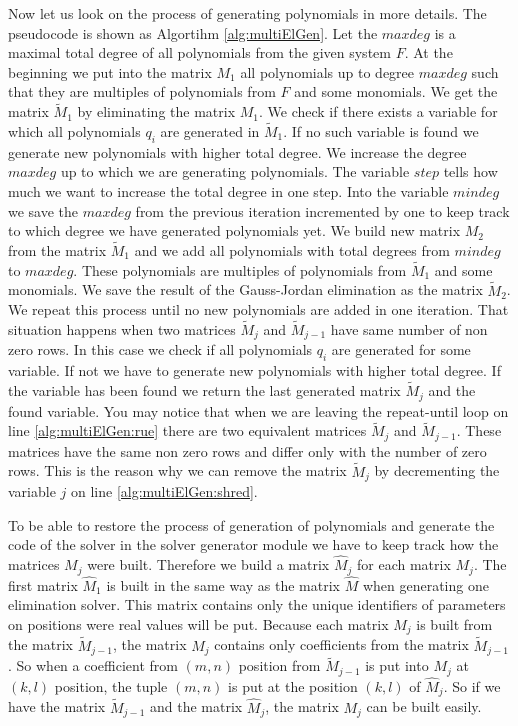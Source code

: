 Now let us look on the process of generating polynomials in more details. The pseudocode is shown as Algortihm \ref{alg:multiElGen}. Let the $maxdeg$ is a maximal total degree of all polynomials from the given system $F$. At the beginning we put into the matrix $M_1$ all polynomials up to degree $maxdeg$ such that they are multiples of polynomials from $F$ and some monomials. We get the matrix $\tilde{M}_1$ by eliminating the matrix $M_1$. We check if there exists a variable for which all polynomials $q_i$ are generated in $\tilde{M}_1$. If no such variable is found we generate new polynomials with higher total degree. We increase the degree $maxdeg$ up to which we are generating polynomials. The variable $step$ tells how much we want to increase the total degree in one step. Into the variable $mindeg$ we save the $maxdeg$ from the previous iteration incremented by one to keep track to which degree we have generated polynomials yet. We build new matrix $M_2$ from the matrix $\tilde{M}_1$ and we add all polynomials with total degrees from $mindeg$ to $maxdeg$. These polynomials are multiples of polynomials from $\tilde{M}_1$ and some monomials. We save the result of the Gauss-Jordan elimination as the matrix $\tilde{M}_2$. We repeat this process until no new polynomials are added in one iteration. That situation happens when two matrices $\tilde{M}_j$ and $\tilde{M}_{j-1}$ have same number of non zero rows. In this case we check if all polynomials $q_i$ are generated for some variable. If not we have to generate new polynomials with higher total degree. If the variable has been found we return the last generated matrix $\tilde{M}_j$ and the found variable. You may notice that when we are leaving the repeat-until loop on line \ref{alg:multiElGen:rue} there are two equivalent matrices $\tilde{M}_j$ and $\tilde{M}_{j-1}$. These matrices have the same non zero rows and differ only with the number of zero rows. This is the reason why we can remove the matrix $\tilde{M}_j$ by decrementing the variable $j$ on line \ref{alg:multiElGen:shred}.



To be able to restore the process of generation of polynomials and generate the code of the solver in the solver generator module we have to keep track how the matrices $M_j$ were built. Therefore we build a matrix $\hat{M}_j$ for each matrix $M_j$. The first matrix $\hat{M}_1$ is built in the same way as the matrix $\hat{M}$ when generating one elimination solver. This matrix contains only the unique identifiers of parameters on positions were real values will be put. Because each matrix $M_j$ is built from the matrix $\tilde{M}_{j-1}$, the matrix $M_j$ contains only coefficients from the matrix $\tilde{M}_{j-1}$. So when a coefficient from $(m,n)$ position from $\tilde{M}_{j-1}$ is put into $M_j$ at $(k, l)$ position, the tuple $(m, n)$ is put at the position $(k, l)$ of $\hat{M}_j$. So if we have the matrix $\tilde{M}_{j-1}$ and the matrix $\hat{M}_j$, the matrix $M_j$ can be built easily.

